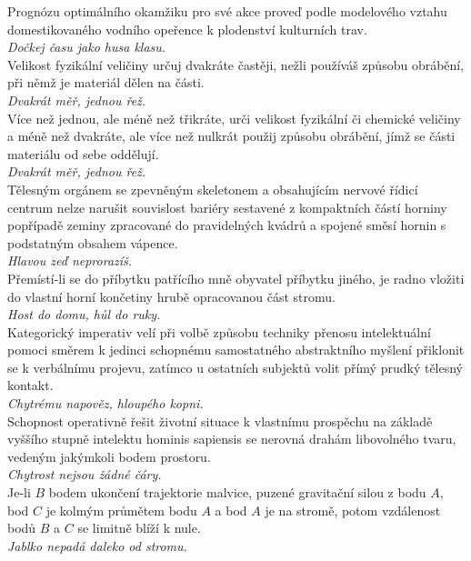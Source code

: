 \begin{multicols}{\value{columnsgames}}
\noindent
Prognózu optimálního okamžiku pro své akce proveď podle modelového
vztahu domestikovaného vodního opeřence k plodenství kulturních
trav.\\[1 mm]
{\sl Dočkej času jako husa klasu.}\\

\noindent
Velikost fyzikální veličiny určuj dvakráte častěji, nežli používáš
způsobu obrábění, při němž je materiál dělen na části.\\[1 mm]
{\sl Dvakrát měř, jednou řež.}\\

\noindent
Více než jednou, ale méně než třikráte, urči velikost fyzikální
či chemické veličiny a méně než dvakráte, ale více než nulkrát
použij způsobu obrábění, jímž se části materiálu od sebe oddělují.\\[1 mm]
{\sl Dvakrát měř, jednou řež.}\\

\noindent
Tělesným orgánem se zpevněným skeletonem a obsahujícím nervové
řídicí centrum nelze narušit souvislost bariéry sestavené z kompaktních
částí horniny popřípadě zeminy zpracované do pravidelných kvádrů a
spojené směsí hornin s podstatným obsahem vápence.\\[1 mm]
{\sl Hlavou zeď neprorazíš.}\\

\noindent
Přemístí-li se do příbytku patřícího mně obyvatel příbytku
jiného, je radno vložiti do vlastní horní končetiny hrubě opracovanou
část stromu.\\[1 mm]
{\sl Host do domu, hůl do ruky.}\\

\noindent
Kategorický imperativ velí při volbě způsobu techniky přenosu
intelektuální pomoci směrem k jedinci schopnému samostatného
abstraktního myšlení přiklonit se k verbálnímu projevu, zatímco
u ostatních subjektů volit přímý prudký tělesný kontakt.\\[1 mm]
{\sl Chytrému napověz, hloupého kopni.}\\

\noindent
Schopnost operativně řešit životní situace k vlastnímu prospěchu
na základě vyššího stupně intelektu hominis sapiensis se nerovná
drahám libovolného tvaru, vedeným jakýmkoli bodem prostoru.\\[1 mm]
{\sl Chytrost nejsou žádné čáry.}\\

\noindent
Je-li $B$ bodem ukončení trajektorie malvice, puzené gravitační
silou z bodu $A$, bod $C$ je kolmým průmětem bodu $A$ a bod $A$ je
na stromě,
potom vzdálenost bodů $B$ a $C$ se limitně blíží
k nule.\\[1 mm]
{\sl Jablko nepadá daleko od stromu.}\\


\end{multicols}
